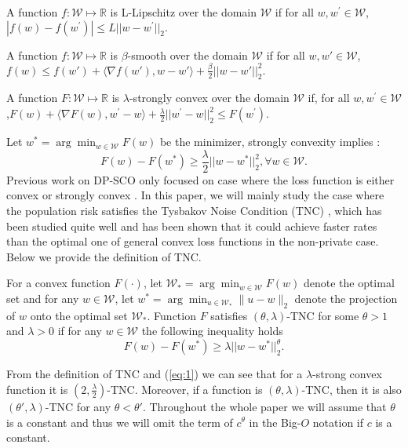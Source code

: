 \documentclass[12pt]{alt2022} %
\begin{document}
	\begin{definition}\label{def:5}
		A function $f:\mathcal{W}\mapsto \mathbb{R}$ is L-Lipschitz over the domain $\mathcal{W}$ if for all $w,w^{\prime}\in \mathcal{W}$,
		$|f(w)-f(w^{\prime})|\leq L||w-w^{\prime}||_2.$
	\end{definition}
	\begin{definition}\label{def:6}
		A function $f:\mathcal{W}\mapsto \mathbb{R}$ is $\beta$-smooth over the domain $\mathcal{W}$ if for all $w,w' \in \mathcal{W}$, 
		$f(w)\leq f(w')+\langle \nabla f(w'), w-w'\rangle +\frac{\beta}{2}||w-w'||_2^2.$
	\end{definition}
	\begin{definition}\label{def:7}
		A function $F:\mathcal{W}\mapsto \mathbb{R}$ is $\lambda$-strongly convex over the domain $\mathcal{W}$ if, for all $w,w^{\prime}\in \mathcal{W}$,$
		F(w)+\langle\nabla F(w),w^{\prime}-w\rangle+\frac{\lambda}{2}||w^{\prime}-w||_2^2\leq F(w^{\prime}). 
		$
	\end{definition}
	Let $w^*=\arg \min_{w\in \mathcal{W}} F(w)$ be the minimizer, 
	strongly convexity implies \citep{hazan2011beyond}:
	\begin{equation}\label{eq:1}
	F(w)-F(w^*)\geq \frac{\lambda}{2}||w-w^*||_2^2, \forall w\in \mathcal{W}.
	\end{equation}
     Previous work on DP-SCO only focused on case where the loss function is  either  convex or strongly convex \citep{bassily2019private,feldman2020private}. In this paper, we will mainly study the case where the population risk satisfies the Tysbakov Noise Condition (TNC) \citep{ramdas2012optimal,liu2018fast}, which has been studied quite well and has been shown that it could achieve faster rates than the optimal one of general convex loss functions in the non-private case.  Below we provide the definition of TNC. 
     \begin{definition}\label{def:8}
         For  a convex function $F(\cdot)$, let $\mathcal{W}_*=\arg\min_{w\in \mathcal{W}} F(w)$ denote the optimal set and for any $w\in \mathcal{W}$, let $w^*=\arg\min_{u\in \mathcal{W}_*}\|u-w\|_2$ denote the projection of $w$ onto the optimal set $\mathcal{W}_*$. 
        Function $F$ satisfies $(\theta, \lambda)$-TNC for some $\theta>1 $ and $\lambda>0$ if for any $w\in \mathcal{W}$ the following inequality holds
		\begin{equation}\label{eq:2}
		F(w)- F(w^*)\geq \lambda||w-w^*||_2^{\theta}. 
		\end{equation}
     \end{definition}
    From the definition of TNC and (\ref{eq:1}) we can see that for a $\lambda$-strong convex function it is $(2, \frac{\lambda}{2})$-TNC. Moreover, if a function is $(\theta, \lambda)$-TNC, then it is also $(\theta', \lambda)$-TNC for any $\theta<\theta' 
    $. Throughout the whole paper we will assume that $\theta$ is a constant and thus we will omit the term of $c^{\theta}$ in the Big-$O$ notation if $c$ is a constant. 
    
\end{document}
